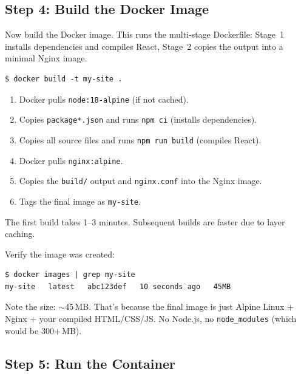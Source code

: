 \documentclass[11pt, letterpaper]{article}
\begin{document}
\subsection{Step 4: Build the Docker Image}

Now build the Docker image. This runs the multi-stage Dockerfile: Stage~1
installs dependencies and compiles React, Stage~2 copies the output into a
minimal Nginx image.

\begin{lstlisting}[style=terminal]
$ docker build -t my-site .
\end{lstlisting}

\begin{infobox}
\begin{enumerate}[nosep]
  \item Docker pulls \texttt{node:18-alpine} (if not cached).
  \item Copies \texttt{package*.json} and runs \texttt{npm ci} (installs
        dependencies).
  \item Copies all source files and runs \texttt{npm run build} (compiles
        React).
  \item Docker pulls \texttt{nginx:alpine}.
  \item Copies the \texttt{build/} output and \texttt{nginx.conf} into the
        Nginx image.
  \item Tags the final image as \texttt{my-site}.
\end{enumerate}
The first build takes 1--3 minutes. Subsequent builds are faster due to layer
caching.
\end{infobox}

Verify the image was created:

\begin{lstlisting}[style=terminal]
$ docker images | grep my-site
my-site   latest   abc123def   10 seconds ago   45MB
\end{lstlisting}

Note the size: $\sim$45\,MB. That's because the final image is just Alpine
Linux + Nginx + your compiled HTML/CSS/JS. No Node.js, no
\texttt{node\_modules} (which would be 300+\,MB).

\subsection{Step 5: Run the Container}
\end{document}
